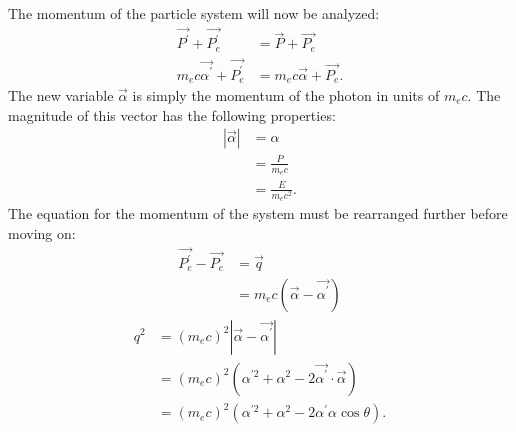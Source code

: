 The momentum of the particle system will now be analyzed:
\begin{align}
  \vec{P^{'}} + \vec{P_e^{'}} & = \vec{P} + \vec{P_e} \nonumber \\
  m_ec\vec{\alpha^{'}} + \vec{P_e^{'}} & = m_ec\vec{\alpha} + \vec{P_e}. \nonumber
\end{align}
The new variable $\vec{\alpha}$ is simply the momentum of the photon in 
units of $m_ec$. The magnitude of this vector has the following properties:
\begin{align}
  \left|\vec{\alpha}\right| & = \alpha \nonumber \\
  & = \frac{P}{m_ec} \\ 
  & = \frac{E}{m_ec^2}.
\end{align}
The equation for the momentum of the system must be rearranged further before
moving on:
\begin{align}
  \vec{P_e^{'}} - \vec{P_e} & = \vec{q} \nonumber \\
  & = m_ec\left(\vec{\alpha} - \vec{\alpha^{'}}\right) \nonumber
\end{align}
\begin{align}
  q^2 & = (m_ec)^2\left|\vec{\alpha} - \vec{\alpha^{'}}\right| \nonumber \\
  & = (m_ec)^2\left(\alpha^{'2} + \alpha^2 - 
  2\vec{\alpha^{'}}\cdot\vec{\alpha}\right) \nonumber \\
  & = (m_ec)^2\left(\alpha^{'2} + \alpha^2 - 2\alpha^{'}\alpha\cos{\theta}\right).
\end{align}

